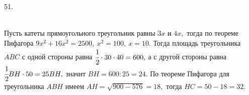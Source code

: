 51. \begin{figure}[ht!]
\end{figure}\\
Пусть катеты прямоугольного треугольник равны $3x$ и $4x,$ тогда по теореме Пифагора $9x^2+16x^2=2500,\ x^2=100,\ x=10.$ Тогда площадь треугольника $ABC$ с одной стороны равна $\cfrac{1}{2}\cdot30\cdot40=600,$ а с другой стороны равна $\cfrac{1}{2}BH\cdot50=25BH,$ значит $BH=600:25=24.$ По теореме Пифагора для треугольника $ABH$ имеем $AH=\sqrt{900-576}=18,$ тогда $HC=50-18=32.$\\
